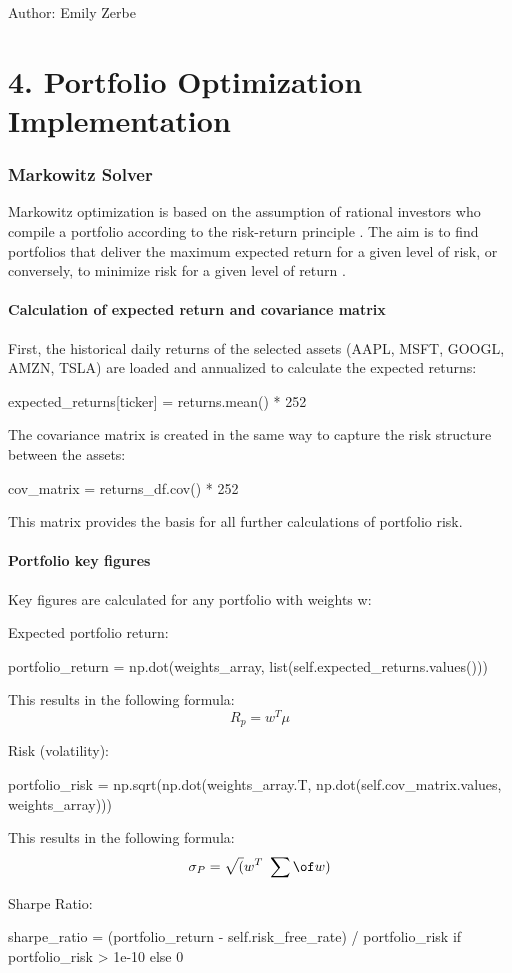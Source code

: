 \documentclass{agasthesis}
\begin{document}
Author: Emily Zerbe
\chapter{4.	Portfolio Optimization Implementation}
\subsection{Markowitz Solver}
Markowitz optimization is based on the assumption of rational investors who compile a portfolio according to the risk-return principle \cite{mangram_simplified_2013}. 
The aim is to find portfolios that deliver the maximum expected return for a given level of risk, or conversely, to minimize risk for a given level of 
return \cite[p. 77-91]{markowitz_portfolio_1952}.
\subsubsection{Calculation of expected return and covariance matrix}
First, the historical daily returns of the selected assets (AAPL, MSFT, GOOGL, AMZN, TSLA) are loaded and annualized to calculate the expected returns:

expected_returns[ticker] = returns.mean() * 252

The covariance matrix is created in the same way to capture the risk structure between the assets:

cov_matrix = returns_df.cov() * 252

This matrix provides the basis for all further calculations of portfolio risk.

\subsubsection{Portfolio key figures}
Key figures are calculated for any portfolio with weights w:

Expected portfolio return:

portfolio_return = np.dot(weights_array, list(self.expected_returns.values()))

This results in the following formula:
\[
R_p = w^{T} \mu
\]

Risk (volatility):

portfolio_risk = np.sqrt(np.dot(weights_array.T, np.dot(self.cov_matrix.values, weights_array)))

This results in the following formula:
\[
\sigma_P=\sqrt(w^T\ \sum\of w)
\]

Sharpe Ratio:

sharpe_ratio = (portfolio_return - self.risk_free_rate) / portfolio_risk if portfolio_risk > 1e-10 else 0
\end{document}
